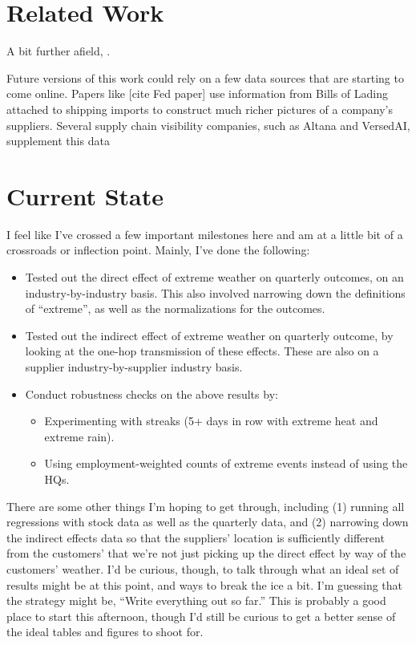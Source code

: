 \documentclass[11pt]{article}
\begin{document}
	
	\section*{Related Work}
	A bit further afield, .
	
	Future versions of this work could rely on a few data sources that are starting to come online. Papers like [cite Fed paper] use information from Bills of Lading attached to shipping imports to construct much richer pictures of a company's suppliers. Several supply chain visibility companies, such as Altana and VersedAI, supplement this data 
	
	\section*{Current State}
	I feel like I've crossed a few important milestones here and am at a little bit of a crossroads or inflection point. Mainly, I've done the following: 
	\begin{itemize}
		\item Tested out the direct effect of extreme weather on quarterly outcomes, on an industry-by-industry basis. This also involved narrowing down the definitions of ``extreme'', as well as the normalizations for the outcomes.
		
		\item Tested out the indirect effect of extreme weather on quarterly outcome, by looking at the one-hop transmission of these effects. These are also on a supplier industry-by-supplier industry basis.
		
		\item Conduct robustness checks on the above results by:
		\begin{itemize}
			\item Experimenting with streaks (5+ days in row with extreme heat and extreme rain).
			
			\item Using employment-weighted counts of extreme events instead of using the HQs.
			
		\end{itemize}
		
	\end{itemize}
	
	There are some other things I'm hoping to get through, including (1) running all regressions with stock data as well as the quarterly data, and (2) narrowing down the indirect effects data so that the suppliers' location is sufficiently different from the customers' that we're not just picking up the direct effect by way of the customers' weather. I'd be curious, though, to talk through what an ideal set of results might be at this point, and ways to break the ice a bit. I'm guessing that the strategy might be, ``Write everything out so far.'' This is probably a good place to start this afternoon, though I'd still be curious to get a better sense of the ideal tables and figures to shoot for.
	
\end{document}
